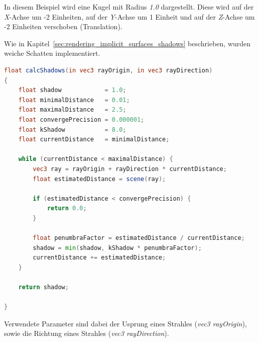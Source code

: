 In diesem Beispiel wird eine Kugel mit Radius \textit{1.0} dargestellt.
Diese wird auf der \textit{X}-Achse um -2 Einheiten, auf der
\textit{Y}-Achse um 1 Einheit und auf der \textit{Z}-Achse um -2
Einheiten verschoben (Translation).

Wie in Kapitel~\ref{sec:rendering_implicit_surfaces_shadows}
beschrieben, wurden weiche Schatten implementiert.

\begin{lstlisting}[language=GLSL,caption={Funktion zur Berechnung von
        weichen Schatten  in
        GLSL.},label={alg:glsl_soft_shadows},captionpos=b,emph={calcShadows}]
float calcShadows(in vec3 rayOrigin, in vec3 rayDirection)
{
    float shadow            = 1.0;
    float minimalDistance   = 0.01;
    float maximalDistance   = 2.5;
    float convergePrecision = 0.000001;
    float kShadow           = 8.0;
    float currentDistance   = minimalDistance;

    while (currentDistance < maximalDistance) {
        vec3 ray = rayOrigin + rayDirection * currentDistance;
        float estimatedDistance = scene(ray);

        if (estimatedDistance < convergePrecision) {
            return 0.0;
        }

        float penumbraFactor = estimatedDistance / currentDistance;
        shadow = min(shadow, kShadow * penumbraFactor);
        currentDistance += estimatedDistance;
    }

    return shadow;

}
\end{lstlisting}

Verwendete Parameter sind dabei der Usprung eines Strahles
(\textit{vec3 rayOrigin}), sowie die Richtung eines Strahles (\textit{vec3
    rayDirection}). 

